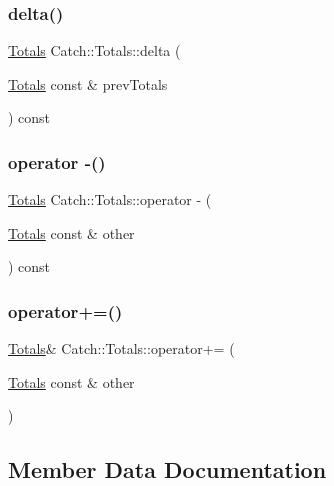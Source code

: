 \subsubsection{\texorpdfstring{delta()}{delta()}}
{\footnotesize\ttfamily \mbox{\hyperlink{struct_catch_1_1_totals}{Totals}} Catch\+::\+Totals\+::delta (\begin{DoxyParamCaption}\item[{\mbox{\hyperlink{struct_catch_1_1_totals}{Totals}} const \&}]{prev\+Totals }\end{DoxyParamCaption}) const}

\mbox{\label{struct_catch_1_1_totals_a4e78ceccf9473cbb117e1803907e174d}} 
\subsubsection{\texorpdfstring{operator -\/()}{operator -()}}
{\footnotesize\ttfamily \mbox{\hyperlink{struct_catch_1_1_totals}{Totals}} Catch\+::\+Totals\+::operator -\/ (\begin{DoxyParamCaption}\item[{\mbox{\hyperlink{struct_catch_1_1_totals}{Totals}} const \&}]{other }\end{DoxyParamCaption}) const}

\mbox{\label{struct_catch_1_1_totals_a574015076e54cc405c70b053e3356e43}} 
\subsubsection{\texorpdfstring{operator+=()}{operator+=()}}
{\footnotesize\ttfamily \mbox{\hyperlink{struct_catch_1_1_totals}{Totals}}\& Catch\+::\+Totals\+::operator+= (\begin{DoxyParamCaption}\item[{\mbox{\hyperlink{struct_catch_1_1_totals}{Totals}} const \&}]{other }\end{DoxyParamCaption})}



\subsection{Member Data Documentation}
\mbox{\label{struct_catch_1_1_totals_a885ded66df752147b30c3d45aa602ec9}} 
